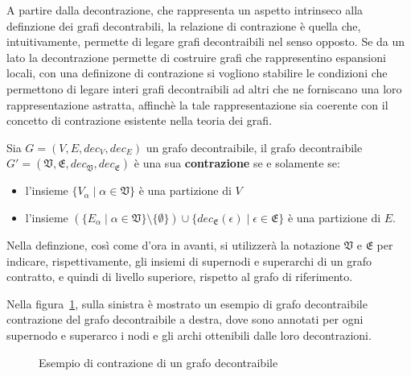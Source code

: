 \label{subsec:contrazioni}

A partire dalla decontrazione, che rappresenta un aspetto intrinseco alla definzione dei grafi decontrabili,
la relazione di contrazione \`e quella che, intuitivamente, permette di legare grafi decontraibili nel senso
opposto.
Se da un lato la decontrazione permette di costruire grafi che rappresentino espansioni locali, con una
definizone di contrazione si vogliono stabilire le condizioni che permettono di legare interi grafi decontraibili
ad altri che ne forniscano una loro rappresentazione astratta, affinch\`e la tale rappresentazione
sia coerente con il concetto di contrazione esistente nella teoria dei grafi.

\begin{definition}
    Sia $G = (V, E, dec_V, dec_E)$ un grafo decontraibile, il grafo decontraibile
    $G\mathcal{'} = (\mathfrak{V}, \mathfrak{E}, dec_{\mathfrak{V}}, dec_{\mathfrak{E}})$ \`e una sua
    \textbf{contrazione} se e solamente se:
        \begin{itemize}
            \item l'insieme $\{V_\alpha \mid \alpha \in \mathfrak{V}\}$ \`e una partizione di $V$
            \item l'insieme $(\{E_\alpha \mid \alpha \in \mathfrak{V}\} \setminus \{ \emptyset \}) \cup
                \{ dec_{\mathfrak{E}}(\epsilon) \mid \epsilon \in \mathfrak{E}\}$ \`e una partizione di $E$.
        \end{itemize}
\end{definition}

Nella definzione, cos\`{i} come d'ora in avanti, si utilizzer\`a la notazione $\mathfrak{V}$ e $\mathfrak{E}$ per
indicare, rispettivamente, gli insiemi di supernodi e superarchi di un grafo contratto, e quindi di livello
superiore, rispetto al grafo di riferimento. \newline

Nella figura~\ref{fig:contraction-example}, sulla sinistra \`e mostrato un esempio di grafo decontraibile
contrazione del grafo decontraibile a destra, dove sono annotati per ogni supernodo e superarco
i nodi e gli archi ottenibili dalle loro decontrazioni. \newline

\begin{figure}
    \centering
    
    \caption{Esempio di contrazione di un grafo decontraibile}
    \label{fig:contraction-example}
\end{figure}

